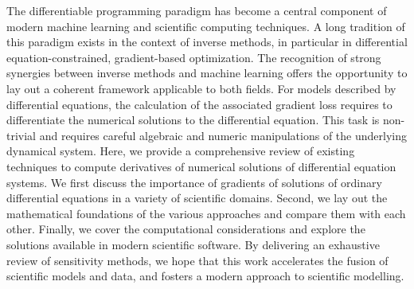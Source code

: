 
The differentiable programming paradigm has become a central component of modern machine learning and scientific computing techniques. 
A long tradition of this paradigm exists in the context of inverse methods, in particular in differential equation-constrained, gradient-based optimization.
The recognition of strong synergies between inverse methods and machine learning offers the opportunity to lay out a coherent framework applicable to both fields.
For models described by differential equations, the calculation of the associated gradient loss requires to differentiate the numerical solutions to the differential equation. 
This task is non-trivial and requires careful algebraic and numeric manipulations of the underlying dynamical system.
Here, we provide a comprehensive review of existing techniques to compute derivatives of numerical solutions of differential equation systems.
We first discuss the importance of gradients of solutions of ordinary differential equations in a variety of scientific domains.
Second, we lay out the mathematical foundations of the various approaches and compare them with each other. 
Finally, we cover the computational considerations and explore the solutions available in modern scientific software. 
By delivering an exhaustive review of sensitivity methods, we hope that this work accelerates the fusion of scientific models and data, and fosters a modern approach to scientific modelling.